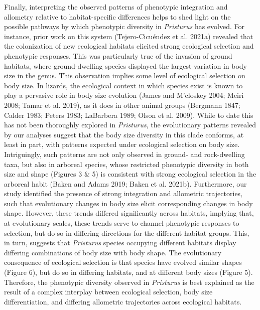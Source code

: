 \documentclass[
  11pt,
]{article}
\providecommand{\DIFaddtex}[1]{{\protect\color{blue}\uwave{#1}}} %
\providecommand{\DIFaddbegin}{} %
\providecommand{\DIFaddend}{} %
\providecommand{\DIFadd}[1]{\texorpdfstring{\DIFaddtex{#1}}{#1}} %
\newcommand{\DIFaddincludegraphics}[2][]{{\color{blue}\fbox{\DIFOincludegraphics[#1]{#2}}}} %
\DeclareRobustCommand{\DIFaddbegin}{\DIFOaddbegin \let\includegraphics\DIFaddincludegraphics} %
\DeclareRobustCommand{\DIFaddend}{\DIFOaddend \let\includegraphics\DIFOincludegraphics} %
\begin{document}
Finally, interpreting the observed patterns of phenotypic integration
and allometry relative to habitat-specific differences helps to shed
light on the possible pathways by which phenotypic diversity in
\emph{Pristurus} has evolved. For instance, prior work on this system
(Tejero-Cicuéndez et al. 2021a) revealed that the colonization of new
ecological habitats elicited strong ecological selection and phenotypic
responses. This was particularly true of the invasion of ground
habitats, where ground-dwelling species displayed the largest variation
in body size in the genus. This observation implies some level of
ecological selection on body size. In lizards, the ecological context in
which species exist is known to play a pervasive role in body size
evolution (James and M'closkey 2004; Meiri 2008; Tamar et al. 2019), as
it does in other animal groups (Bergmann 1847; Calder 1983; Peters 1983;
LaBarbera 1989; Olson et al. 2009). While to date this has not been
thoroughly explored in \emph{Pristurus}, the evolutionary patterns
revealed by our analyses suggest that the body size diversity in this
clade conforms, at least in part, with patterns expected under
ecological selection on body size. Intriguingly, such patterns are not
only observed in ground- and rock-dwelling taxa, but also in arboreal
species, whose restricted phenotypic diversity in both size and shape
(Figures 3 \& 5) is consistent with strong ecological selection in the
arboreal habit (Baken and Adams 2019; Baken et al. 2021b). Furthermore,
our study identified the presence of strong integration and allometric
trajectories, such that evolutionary changes in body size elicit
corresponding changes in \DIFaddbegin \textbf{\DIFadd{CHANGE}}\DIFaddend body shape. However, these
trends differed significantly across habitats, implying that, at
evolutionary scales, these trends serve to channel phenotypic responses
to selection, but do so in differing directions for the different
habitat groups. This, in turn, suggests that \emph{Pristurus} species
occupying different habitats display differing combinations of body size
with \DIFaddbegin \textbf{\DIFadd{CHANGE}}\DIFaddend body shape. The evolutionary consequence of
ecological selection is that species have evolved similar shapes (Figure
6), but do so in differing habitats, and at different body sizes (Figure
5). Therefore, the phenotypic diversity observed in \emph{Pristurus} is
best explained as the result of a complex interplay between ecological
selection, body size differentiation, and differing allometric
trajectories across ecological habitats.
\end{document}
